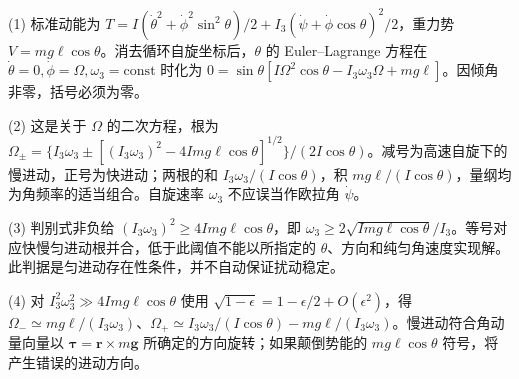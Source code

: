(1) 标准动能为 \(T=I(\dot\theta^2+\dot\phi^2\sin^2\theta)/2+I_3(\dot\psi+\dot\phi\cos\theta)^2/2\)，重力势 \(V=mg\ell\cos\theta\)。消去循环自旋坐标后，\(\theta\) 的 Euler--Lagrange 方程在 \(\dot\theta=0,\dot\phi=\Omega,\omega_3=\mathrm{const}\) 时化为 \(0=\sin\theta[I\Omega^2\cos\theta-I_3\omega_3\Omega+mg\ell]\)。因倾角非零，括号必须为零。

(2) 这是关于 \(\Omega\) 的二次方程，根为 \(\Omega_\pm=\{I_3\omega_3\pm[(I_3\omega_3)^2-4Img\ell\cos\theta]^{1/2}\}/(2I\cos\theta)\)。减号为高速自旋下的慢进动，正号为快进动；两根的和 \(I_3\omega_3/(I\cos\theta)\)，积 \(mg\ell/(I\cos\theta)\)，量纲均为角频率的适当组合。自旋速率 \(\omega_3\) 不应误当作欧拉角 \(\dot\psi\)。

(3) 判别式非负给 \((I_3\omega_3)^2\ge4Img\ell\cos\theta\)，即 \(\omega_3\ge 2\sqrt{Img\ell\cos\theta}/I_3\)。等号对应快慢匀进动根并合，低于此阈值不能以所指定的 \(\theta\)、方向和纯匀角速度实现解。此判据是匀进动存在性条件，并不自动保证扰动稳定。

(4) 对 \(I_3^2\omega_3^2\gg4Img\ell\cos\theta\) 使用 \(\sqrt{1-\epsilon}=1-\epsilon/2+O(\epsilon^2)\)，得 \(\Omega_-\simeq mg\ell/(I_3\omega_3)\)、\(\Omega_+\simeq I_3\omega_3/(I\cos\theta)-mg\ell/(I_3\omega_3)\)。慢进动符合角动量向量以 \(\boldsymbol\tau=\boldsymbol r\times m\boldsymbol g\) 所确定的方向旋转；如果颠倒势能的 \(mg\ell\cos\theta\) 符号，将产生错误的进动方向。
